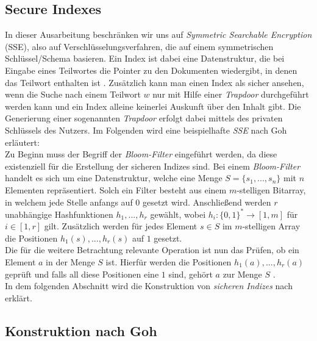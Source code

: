 \documentclass[conference]{IEEEtran}
\begin{document}
\subsection{Secure Indexes}
In dieser Ausarbeitung beschränken wir uns auf \textit{Symmetric Searchable Encryption} (SSE), also auf Verschlüsselungsverfahren, die auf einem symmetrischen Schlüssel/Schema basieren. Ein Index ist dabei eine Datenstruktur, die bei Eingabe eines Teilwortes die Pointer zu den Dokumenten wiedergibt, in denen das Teilwort enthalten ist \cite{sse}. Zusätzlich kann man einen Index als sicher ansehen, wenn die Suche nach einem Teilwort $w$ nur mit Hilfe einer \textit{Trapdoor} durchgeführt werden kann und ein Index alleine keinerlei Auskunft über den Inhalt gibt. Die Generierung einer sogenannten \textit{Trapdoor} erfolgt dabei mittels des privaten Schlüssels des Nutzers. Im Folgenden wird eine beispielhafte \textit{SSE} nach Goh \cite{gohindex} erläutert:\\
Zu Beginn muss der Begriff der \textit{Bloom-Filter} eingeführt werden, da diese existenziell für die Erstellung der sicheren Indizes sind. Bei einem \textit{Bloom-Filter} handelt es sich um eine Datenstruktur, welche eine Menge $S = \{s_1,...,s_n\}$ mit $n$ Elementen repräsentiert. Solch ein Filter besteht aus einem $m$-stelligen Bitarray, in welchem jede Stelle anfangs auf $0$ gesetzt wird. Anschließend werden $r$ unabhängige Hashfunktionen $h_1,...,h_r$ gewählt, wobei $h_i : \{0,1\}^* \rightarrow [1,m]$ für $i \in [1,r]$ gilt. Zusätzlich werden für jedes Element $s \in S$ im $m$-stelligen Array die Positionen $h_1(s),...,h_r(s)$ auf $1$ gesetzt.\\
Die für die weitere Betrachtung relevante Operation ist nun das Prüfen, ob ein Element $a$ in der Menge $S$ ist. Hierfür werden die Positionen $h_1(a),...,h_r(a)$ geprüft und falls all diese Positionen eine $1$ sind, gehört $a$ zur Menge $S$ \cite{bloom}.\\
In dem folgenden Abschnitt wird die Konstruktion von \textit{sicheren Indizes} nach \cite{gohindex} erklärt.

\subsection{Konstruktion nach Goh \cite{gohindex}}
\end{document}
